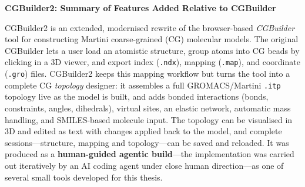 \documentclass[11pt]{article}
\begin{document}
\begin{center}
    {\large\bfseries CGBuilder2: Summary of Features Added Relative to CGBuilder}
\end{center}

\vspace{-0.7em}

CGBuilder2 is an extended, modernised rewrite of the browser-based \textit{CGBuilder}
tool for constructing Martini coarse-grained (CG) molecular models. The original
CGBuilder lets a user load an atomistic structure, group atoms into CG beads by
clicking in a 3D viewer, and export index (\texttt{.ndx}), mapping (\texttt{.map}),
and coordinate (\texttt{.gro}) files. CGBuilder2 keeps this mapping workflow but
turns the tool into a complete CG \emph{topology} designer: it assembles a full
GROMACS/Martini \texttt{.itp} topology live as the model is built, and adds bonded
interactions (bonds, constraints, angles, dihedrals), virtual sites, an elastic
network, automatic mass handling, and SMILES-based molecule input. The topology can
be visualised in 3D and edited as text with changes applied back to the model, and
complete sessions---structure, mapping and topology---can be saved and reloaded. It
was produced as a \textbf{human-guided agentic build}---the implementation was
carried out iteratively by an AI coding agent under close human direction---as one
of several small tools developed for this thesis.
\end{document}
